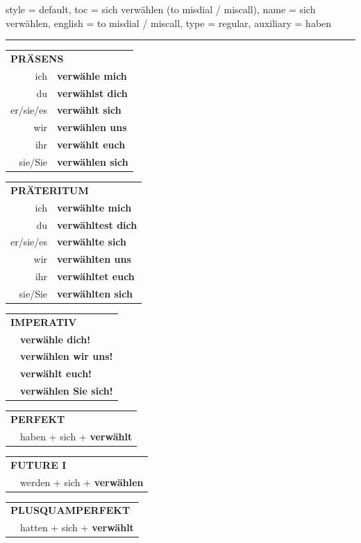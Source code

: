 \begin{verbentry}{
  style = {default},
  toc = {sich verwählen (to misdial / miscall)},
  name = {sich verwählen},
  english = {to misdial / miscall},
  type = {regular},
  auxiliary = {haben}
}


\vspace{5pt}
\hrule
\vspace{5pt}

\begin{tabular}{rl}
\multicolumn{2}{l}{\textbf{PRÄSENS}}\\
ich & \textbf{verwähle mich}\\
du & \textbf{verwählst dich}\\
er/sie/es & \textbf{verwählt sich}\\
wir & \textbf{verwählen uns}\\
ihr & \textbf{verwählt euch}\\
sie/Sie & \textbf{verwählen sich}\\
\end{tabular}
\hfill
\begin{tabular}{rl}
\multicolumn{2}{l}{\textbf{PRÄTERITUM}}\\
ich & \textbf{verwählte mich}\\
du & \textbf{verwähltest dich}\\
er/sie/es & \textbf{verwählte sich}\\
wir & \textbf{verwählten uns}\\
ihr & \textbf{verwähltet euch}\\
sie/Sie & \textbf{verwählten sich}\\
\end{tabular}
\hfill
\begin{tabular}{rl}
\multicolumn{2}{l}{\textbf{IMPERATIV}}\\
& \textbf{verwähle dich!}\\
& \textbf{verwählen wir uns!}\\
& \textbf{verwählt euch!}\\
& \textbf{verwählen Sie sich!}\\
\end{tabular}

\vspace{10pt}

\begin{tabular}{rl}
\multicolumn{2}{l}{\textbf{PERFEKT}}\\
& haben + sich + \textbf{verwählt}\\
\end{tabular}
\hfill
\begin{tabular}{rl}
\multicolumn{2}{l}{\textbf{FUTURE I}}\\
& werden + sich + \textbf{verwählen}\\
\end{tabular}
\hfill
\begin{tabular}{rl}
\multicolumn{2}{l}{\textbf{PLUSQUAMPERFEKT}}\\
& hatten + sich + \textbf{verwählt}\\
\end{tabular}


\end{verbentry}
